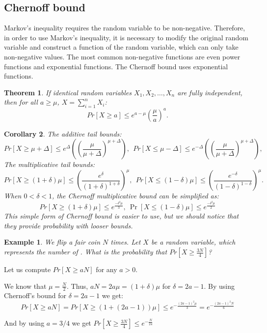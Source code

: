 \documentclass[11pt]{article}
\newtheorem{exmp}{Example}[section]
\newtheorem{theorem}{Theorem}
\newtheorem{corollary}[theorem]{Corollary}
\begin{document}
\subsection{Chernoff bound}
Markov's inequality requires the random variable to be non-negative. Therefore, in order to use Markov's inequality, it is necessary to modify the original random variable and construct a function of the random variable, which can only take non-negative values. The most common non-negative functions are even power functions and exponential functions.
The Chernoff bound uses exponential functions.
\begin{theorem}
If identical random variables $X_1,X_2,\ldots,X_n$ are fully independent, then for all $a\ge \mu$, $X=\sum_{i=1}^n X_i$:
\[
Pr[X\ge a]\leq e^{a-\mu}\left(\frac{\mu}{a}\right)^a.
\]
\end{theorem}
\begin{corollary}
The additive tail bounds:
\[
Pr[X\ge \mu+\Delta]\leq e^\Delta \left(\left(\frac{\mu}{\mu +\Delta}\right)^{\mu+\Delta}\right),
\ \ Pr[X\leq \mu-\Delta]\leq e^{-\Delta}\left(\left(\frac{\mu}{\mu +\Delta}\right)^{\mu+\Delta}\right),
\]
The multiplicative tail bounds:
\[Pr[X\ge (1+\delta)\mu] \leq
 \left(\frac{e^\delta}{(1+\delta)^{1+\delta}}\right)^\mu ,\ \ Pr[X\leq (1-\delta)\mu] \leq
 \left(\frac{e^{-\delta}}{(1-\delta)^{1-\delta}}\right)^\mu.
\]
When $0<\delta<1$, the Chernoff multiplicative bound can be simplified as:
\[
Pr[X\ge (1+\delta)\mu] \leq e^{\frac{-\delta^2\mu}{3}},\ \Pr[X\leq (1-\delta)\mu]  \leq e^{\frac{-\delta^2\mu}{2}}
\]
This simple form of Chernoff bound is easier to use, but we should notice that they provide probability with looser bounds.
\end{corollary}
\begin{exmp}
We flip a fair coin $N$ times. Let $X$ be a random variable, which represents the number of . What is the probability that $Pr\left[X\ge \frac{3N}{4}\right]$?
\end{exmp}
Let us compute $Pr[X \ge aN]$ for any $a> 0$. 

We know that $\mu=\frac{N}{2}$. Thus, $aN = 2a\mu = (1+\delta)\mu$ for $\delta = 2a-1$. %
By using Chernoff's bound for $\delta = 2a-1$ we get:
\[
Pr[X\ge aN] = Pr[X\ge (1+(2a-1))\mu] \leq e^{-\frac{(2a-1)^2 \mu}{3}} = e^{-\frac{(2a-1)^2 N}{6}} 
\]

And by using $a = 3/4$ we get $Pr\left[X \ge \frac{3N}{4}\right] \le e^{-\frac{N}{24}}$
\end{document}
